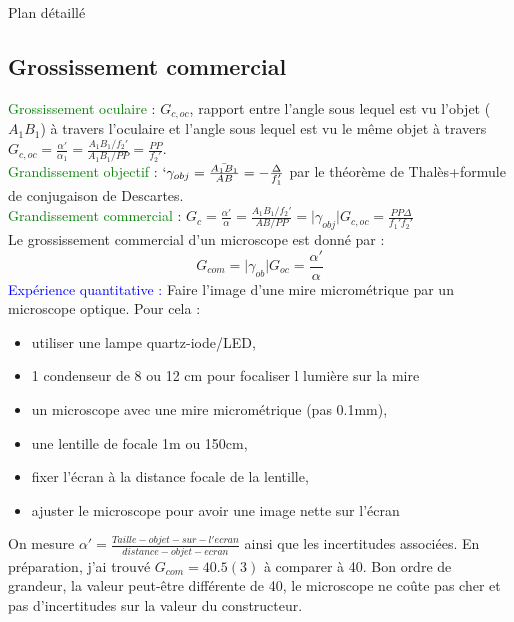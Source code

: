 \begin{reportBlock}{Plan détaillé}
  \subsection{Grossissement commercial}
  \textcolor{green}{Grossissement oculaire }: $G_{c,oc}$, rapport entre l'angle sous lequel est vu l'objet ($A_1B_1$) à travers l'oculaire et l'angle sous lequel est vu le même objet à travers $G_{c,oc}=\frac{\alpha'}{\alpha_1}=\frac{A_1B_1/f_2'}{A_1B_1/PP}=\frac{PP}{f_2'}$.\\
  \textcolor{green}{Grandissement objectif} : $`\gamma_{obj}=\frac{\bar{A_1B_1}}{AB}=-\frac{\Delta}{f_1'}$ par le théorème de Thalès+formule de conjugaison de Descartes.\\
  \textcolor{green}{Grandissement commercial} : $G_{c}=\frac{\alpha'}{\alpha}=\frac{A_1B_1/f_2'}{AB/PP}=\lvert \gamma_{obj} \rvert G_{c,oc} = \frac{PP\Delta}{f_1'f_2'}$\\  
  Le grossissement commercial d'un microscope est donné par :
  \begin{equation}
     G_{com} = \lvert \gamma_{ob}\rvert G_{oc} = \frac{\alpha'}{\alpha}
  \end{equation}
 \textcolor{blue}{Expérience quantitative :} Faire l'image d'une mire micrométrique par un microscope optique. Pour cela : \begin{itemize}
      \item utiliser une lampe quartz-iode/LED,
      \item 1 condenseur de 8 ou 12 cm pour focaliser l lumière sur la mire
      \item un microscope avec une mire micrométrique (pas 0.1mm),
      \item une lentille de focale 1m ou 150cm,
      \item fixer l'écran à la distance focale de la lentille,
      \item ajuster le microscope pour avoir une image nette sur l'écran
  \end{itemize} 
 On mesure $\alpha'= \frac{Taille-objet-sur-l'ecran}{distance-objet-ecran}$ ainsi que les incertitudes associées. 
 En préparation, j'ai trouvé $G_{com}=40.5(3)$ à comparer à 40. Bon ordre de grandeur, la valeur peut-être différente de 40, le microscope ne coûte pas cher et pas d'incertitudes sur la valeur du constructeur.\\
  

\end{reportBlock}
